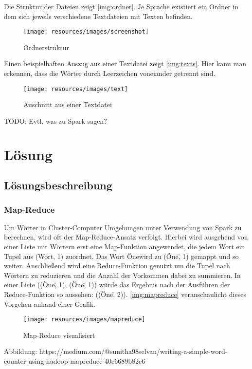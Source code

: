 \documentclass[chapterprefix=true, 12pt, a4paper, oneside, parskip=half, listof=totoc, bibliography=totoc, numbers=noendperiod]{scrbook}
\begin{document}
Die Struktur der Dateien zeigt \autoref{img:ordner}. Je Sprache existiert ein Ordner in dem sich jeweils verschiedene Textdateien mit Texten befinden. 
\begin{figure}[H]
	\texttt{[image: resources/images/screenshot]}
	\caption{Ordnerstruktur}
	\label{img:ordner}
\end{figure}

Einen beispielhaften Auszug aus einer Textdatei zeigt \autoref{img:texts}. Hier kann man erkennen, dass die Wörter durch Leerzeichen voneiander getrennt sind.
\begin{figure}[H]
	\texttt{[image: resources/images/text]}
	\caption{Auschnitt aus einer Textdatei}
	\label{img:texts}
\end{figure}	

TODO: Evtl. was zu Spark sagen?
\chapter{Lösung}
\section{Lösungsbeschreibung}
\subsection{Map-Reduce}
Um Wörter in Cluster-Computer Umgebungen unter Verwendung von Spark zu berechnen, wird oft der Map-Reduce-Ansatz verfolgt. Hierbei wird ausgehend von einer Liste mit Wörtern erst eine Map-Funktion angewendet, die jedem Wort ein Tupel aus (Wort, 1) zuordnet. Das Wort \"One\" wird zu (\"One\", 1) gemappt und so weiter. Anschließend wird eine Reduce-Funktion genutzt um die Tupel nach Wörtern zu reduzieren und die Anzahl der Vorkommen dabei zu summieren. In einer Liste ((\"One\", 1), (\"One\", 1)) würde das Ergebnis nach der Ausführen der Reduce-Funktion so aussehen: ((\"One\", 2)). \autoref{img:mapreduce} veranschaulicht dieses Vorgehen anhand einer Grafik.
\begin{figure}[H]
	\texttt{[image: resources/images/mapreduce]}
	\caption{Map-Reduce visualisiert}
	\label{img:mapreduce}
\end{figure}
Abbildung: https://medium.com/@sunitha98selvan/writing-a-simple-word-counter-using-hadoop-mapreduce-40c6689b82e6
\end{document}
